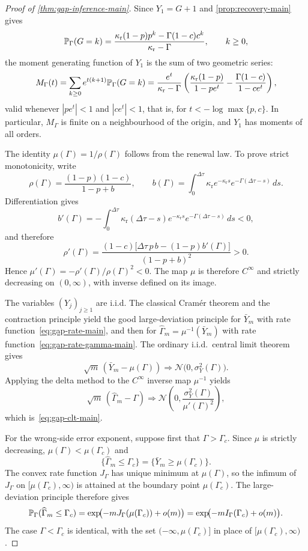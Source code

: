\begin{proof}[Proof of \cref{thm:gap-inference-main}]
Since $Y_1=G+1$ and \cref{prop:recovery-main} gives
\[
\mathbb{P}_\Gamma(G=k)=
\frac{\kappa_{\mathrm r}(1-p)p^k-\Gamma(1-c)c^k}{\kappa_{\mathrm r}-\Gamma},
\qquad k\ge0,
\]
the moment generating function of $Y_1$ is the sum of two geometric series:
\[
M_\Gamma(t)
=
\sum_{k\ge0}e^{t(k+1)}\mathbb{P}_\Gamma(G=k)
=
\frac{e^t}{\kappa_{\mathrm r}-\Gamma}
\left(
\frac{\kappa_{\mathrm r}(1-p)}{1-pe^t}
-
\frac{\Gamma(1-c)}{1-ce^t}
\right),
\]
valid whenever $|pe^t|<1$ and $|ce^t|<1$, that is, for $t<-\log\max\{p,c\}$. In particular, $M_\Gamma$ is finite on a neighbourhood of the origin, and $Y_1$ has moments of all orders.

The identity $\mu(\Gamma)=1/\rho(\Gamma)$ follows from the renewal law. To prove strict monotonicity, write
\[
\rho(\Gamma)=\frac{(1-p)(1-c)}{1-p+b},
\qquad
b(\Gamma)=\int_0^{\Delta\tau}\kappa_{\mathrm r}e^{-\kappa_{\mathrm r}s}e^{-\Gamma(\Delta\tau-s)}\,ds.
\]
Differentiation gives
\[
b'(\Gamma)
=
-\int_0^{\Delta\tau}\kappa_{\mathrm r}(\Delta\tau-s)e^{-\kappa_{\mathrm r}s}e^{-\Gamma(\Delta\tau-s)}\,ds<0,
\]
and therefore
\[
\rho'(\Gamma)
=
\frac{(1-c)\bigl[\Delta\tau\,p\,b-(1-p)b'(\Gamma)\bigr]}{(1-p+b)^2}
>0.
\]
Hence $\mu'(\Gamma)=-\rho'(\Gamma)/\rho(\Gamma)^2<0$. The map $\mu$ is therefore $C^\infty$ and strictly decreasing on $(0,\infty)$, with inverse defined on its image.

The variables $(Y_j)_{j\ge1}$ are i.i.d. The classical Cram\'er theorem and the contraction principle \cite{DemboZeitouni1998} yield the good large-deviation principle for $\bar Y_m$ with rate function~\eqref{eq:gap-rate-main}, and then for $\widehat\Gamma_m=\mu^{-1}(\bar Y_m)$ with rate function~\eqref{eq:gap-rate-gamma-main}. The ordinary i.i.d.\ central limit theorem gives
\[
\sqrt m\,(\bar Y_m-\mu(\Gamma))
\Longrightarrow
\mathcal N\!\bigl(0,\sigma_Y^2(\Gamma)\bigr).
\]
Applying the delta method to the $C^\infty$ inverse map $\mu^{-1}$ \cite{vanDerVaart1998} yields
\[
\sqrt m\,(\widehat\Gamma_m-\Gamma)
\Longrightarrow
\mathcal N\!\left(0,\frac{\sigma_Y^2(\Gamma)}{\mu'(\Gamma)^2}\right),
\]
which is~\eqref{eq:gap-clt-main}.

For the wrong-side error exponent, suppose first that $\Gamma>\Gamma_c$. Since $\mu$ is strictly decreasing, $\mu(\Gamma)<\mu(\Gamma_c)$ and
\[
\{\widehat\Gamma_m\le\Gamma_c\}
=
\{\bar Y_m\ge\mu(\Gamma_c)\}.
\]
The convex rate function $J_\Gamma$ has unique minimum at $\mu(\Gamma)$, so the infimum of $J_\Gamma$ on $[\mu(\Gamma_c),\infty)$ is attained at the boundary point $\mu(\Gamma_c)$. The large-deviation principle therefore gives
\[
\mathbb{P}_\Gamma(\widehat\Gamma_m\le\Gamma_c)
=
\exp\!\bigl(-mJ_\Gamma(\mu(\Gamma_c))+o(m)\bigr)
=
\exp\!\bigl(-mI_\Gamma(\Gamma_c)+o(m)\bigr).
\]
The case $\Gamma<\Gamma_c$ is identical, with the set $(-\infty,\mu(\Gamma_c)]$ in place of $[\mu(\Gamma_c),\infty)$.
\end{proof}

